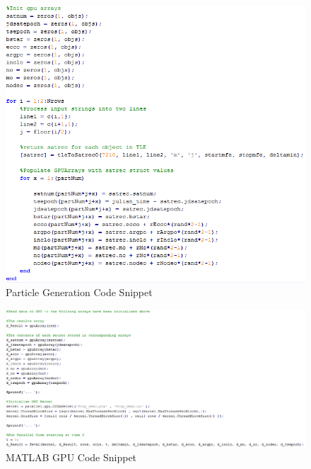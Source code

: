 \documentclass[12pt,openany,a4paper]{book}
\begin{document}
	\begin{figure}[H]
		\centering
		\caption{Particle Generation Code Snippet}
		\label{TLEread}
		\includegraphics[scale=0.8]{particleToSatrec.png}
	\end{figure}
	
	\begin{figure}[H]
		\centering
		\caption{MATLAB GPU Code Snippet}
		\label{MGPU}
		\includegraphics[scale=0.8]{MGPU.png}
	\end{figure}
	
\end{document}
